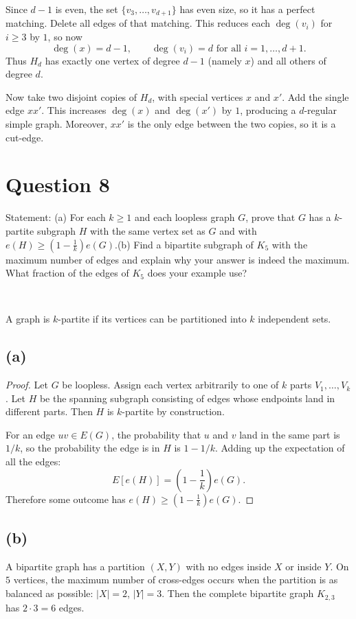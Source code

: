 \documentclass[11pt]{article}
\begin{document}
Since $d-1$ is even, the set $\{v_3,\dots,v_{d+1}\}$ has even size, so it has a perfect matching.
Delete all edges of that matching. This reduces each $\deg(v_i)$ for $i\ge 3$ by $1$, so now
\[
\deg(x)=d-1,\qquad \deg(v_i)=d \text{ for all } i=1,\dots,d+1.
\]
Thus $H_d$ has exactly one vertex of degree $d-1$ (namely $x$) and all others of degree $d$.

Now take two disjoint copies of $H_d$, with special vertices $x$ and $x'$.
Add the single edge $xx'$. This increases $\deg(x)$ and $\deg(x')$ by $1$, producing a $d$-regular simple graph.
Moreover, $xx'$ is the only edge between the two copies, so it is a cut-edge.

\newpage

\section*{Question 8}

Statement: (a) For each $k \ge 1$ and each loopless graph $G$, prove that $G$ has a $k$-partite subgraph $H$ with the same vertex set as $G$ and with $e(H) \ge (1 - \frac1k )e(G)$.(b) Find a bipartite subgraph of $K_5$ with the maximum number of edges and explain why your answer is indeed the maximum. What fraction of the edges of $K_5$ does your example use?

~

A graph is $k$-partite if its vertices can be partitioned into $k$ independent sets.

\subsection*{(a)}
\begin{proof}
    Let $G$ be loopless. Assign each vertex arbitrarily to one of $k$ parts
$V_1,\dots,V_k$. Let $H$ be the spanning subgraph consisting of edges whose endpoints land in different parts.
Then $H$ is $k$-partite by construction.

For an edge $uv\in E(G)$, the probability that $u$ and $v$ land in the same part is $1/k$,
so the probability the edge is in $H$ is $1-1/k$. Adding up the expectation of all the edges:
\[
E[e(H)] = \left(1-\frac{1}{k}\right)e(G).
\]
Therefore some outcome has $e(H)\ge \left(1-\frac{1}{k}\right)e(G)$.
\end{proof}

\subsection*{(b)}
A bipartite graph has a partition $(X,Y)$ with no edges inside $X$ or inside $Y$.
On $5$ vertices, the maximum number of cross-edges occurs when the partition is as balanced as possible:
$|X|=2$, $|Y|=3$. Then the complete bipartite graph $K_{2,3}$ has $2\cdot 3=6$ edges.
\end{document}
